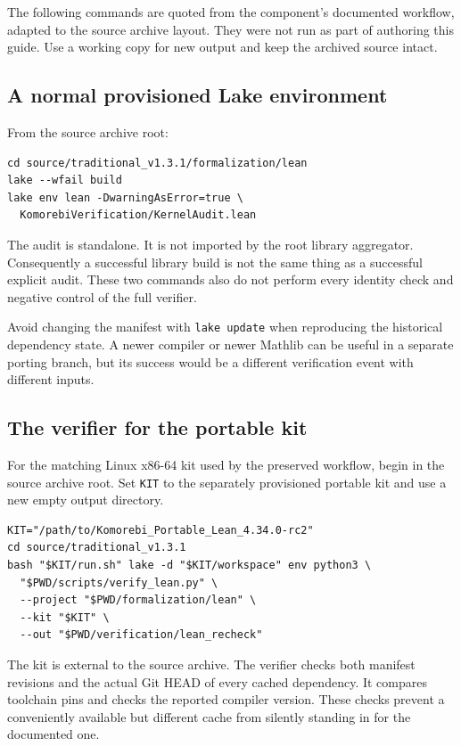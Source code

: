 \documentclass[11pt,a4paper]{article}
\newcommand{\code}[1]{\nolinkurl{#1}}
\begin{document}
The following commands are quoted from the component's documented workflow, adapted to the source archive layout. They were not run as part of authoring this guide. Use a working copy for new output and keep the archived source intact.

\subsection{A normal provisioned Lake environment}

From the source archive root:
\begin{lstlisting}
cd source/traditional_v1.3.1/formalization/lean
lake --wfail build
lake env lean -DwarningAsError=true \
  KomorebiVerification/KernelAudit.lean
\end{lstlisting}

The audit is standalone. It is not imported by the root library aggregator. Consequently a successful library build is not the same thing as a successful explicit audit. These two commands also do not perform every identity check and negative control of the full verifier.

Avoid changing the manifest with \code{lake update} when reproducing the historical dependency state. A newer compiler or newer Mathlib can be useful in a separate porting branch, but its success would be a different verification event with different inputs.

\subsection{The verifier for the portable kit}

For the matching Linux x86-64 kit used by the preserved workflow, begin in the source archive root. Set \code{KIT} to the separately provisioned portable kit and use a new empty output directory.
\begin{lstlisting}
KIT="/path/to/Komorebi_Portable_Lean_4.34.0-rc2"
cd source/traditional_v1.3.1
bash "$KIT/run.sh" lake -d "$KIT/workspace" env python3 \
  "$PWD/scripts/verify_lean.py" \
  --project "$PWD/formalization/lean" \
  --kit "$KIT" \
  --out "$PWD/verification/lean_recheck"
\end{lstlisting}

The kit is external to the source archive. The verifier checks both manifest revisions and the actual Git HEAD of every cached dependency. It compares toolchain pins and checks the reported compiler version. These checks prevent a conveniently available but different cache from silently standing in for the documented one.
\end{document}
